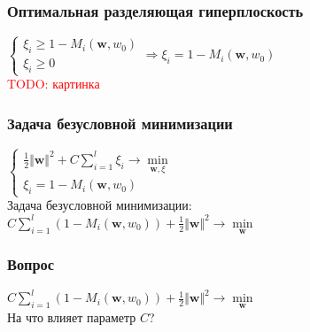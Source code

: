 \documentclass[12pt]{beamer}
\begin{document}
\begin{frame}\frametitle{Оптимальная разделяющая гиперплоскость}
$\begin{cases}
\xi_i \geq 1 - M_i(\mathbf{w}, w_0) \\
\xi_i \geq 0
\end{cases} \Rightarrow \xi_i = 1 - M_i(\mathbf{w}, w_0) $\\
\textcolor{red}{TODO: картинка}
\end{frame}


\begin{frame}\frametitle{Задача безусловной минимизации}
$\begin{cases}
{\frac{1}{2}\Vert \mathbf{w} \Vert^2 + C \sum\limits_{i=1}^l \xi_i \rightarrow \min\limits_{\mathbf{w}, \xi}}\\
\xi_i = 1 - M_i(\mathbf{w}, w_0)
\end{cases}$\\
\vspace{5mm}
Задача безусловной минимизации:\\
$ C \sum\limits_{i=1}^l (1 - M_i(\mathbf{w}, w_0)) + \frac{1}{2}\Vert \mathbf{w} \Vert^2 \rightarrow \min\limits_{\mathbf{w}}$
\end{frame}

\begin{frame}\frametitle{Вопрос}
$ C \sum\limits_{i=1}^l (1 - M_i(\mathbf{w}, w_0)) + \frac{1}{2}\Vert \mathbf{w} \Vert^2 \rightarrow \min\limits_{\mathbf{w}}$\\
\vspace{5mm}
На что влияет параметр $C$?
\end{frame}
\end{document}
